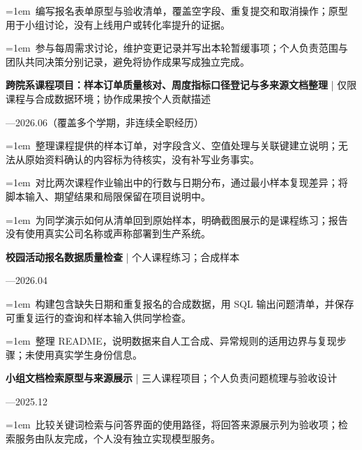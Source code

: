 \documentclass[11pt,a4paper,fontset=fandol]{ctexart}
\begin{document}
\noindent\hangindent=1em\textbullet\ 编写报名表单原型与验收清单，覆盖空字段、重复提交和取消操作；原型用于小组讨论，没有上线用户或转化率提升的证据。\par
\noindent\hangindent=1em\textbullet\ 参与每周需求讨论，维护变更记录并写出本轮暂缓事项；个人负责范围与团队共同决策分别记录，避免将协作成果写成独立完成。\par
\par\medskip{}\par\nobreak
\begin{minipage}{\linewidth}
\textbf{跨院系课程项目：样本订单质量核对、周度指标口径登记与多来源文档整理} | 仅限课程与合成数据环境；协作成果按个人贡献描述\par
{\small{}—2026.06（覆盖多个学期，非连续全职经历）\par}
\noindent\hangindent=1em\textbullet\ 整理课程提供的样本订单，对字段含义、空值处理与关联键建立说明；无法从原始资料确认的内容标为待核实，没有补写业务事实。\par
\end{minipage}\par
\noindent\hangindent=1em\textbullet\ 对比两次课程作业输出中的行数与日期分布，通过最小样本复现差异；将脚本输入、期望结果和局限保留在项目说明中。\par
\noindent\hangindent=1em\textbullet\ 为同学演示如何从清单回到原始样本，明确截图展示的是课程练习；报告没有使用真实公司名称或声称部署到生产系统。\par
\begin{minipage}{\linewidth}
\textbf{校园活动报名数据质量检查} | 个人课程练习；合成样本\par
{\small{}—2026.04\par}
\noindent\hangindent=1em\textbullet\ 构建包含缺失日期和重复报名的合成数据，用 SQL 输出问题清单，并保存可重复运行的查询和样本输入供同学检查。\par
\end{minipage}\par
\noindent\hangindent=1em\textbullet\ 整理 README，说明数据来自人工合成、异常规则的适用边界与复现步骤；未使用真实学生身份信息。\par
\begin{minipage}{\linewidth}
\textbf{小组文档检索原型与来源展示} | 三人课程项目；个人负责问题梳理与验收设计\par
{\small{}—2025.12\par}
\noindent\hangindent=1em\textbullet\ 比较关键词检索与问答界面的使用路径，将回答来源展示列为验收项；检索服务由队友完成，个人没有独立实现模型服务。\par
\end{minipage}\par
\end{document}
